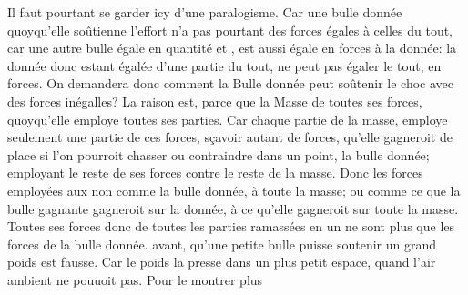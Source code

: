  \pstart Il faut pourtant se garder icy d'une paralogisme. Car une bulle donn\'{e}e quoyqu'elle soûtienne l'effort  n'a pas pourtant des forces \'{e}gales \`{a} celles du tout, car une autre bulle \'{e}gale en quantit\'{e} et , est aussi \'{e}gale en forces \`{a} la donn\'{e}e: la donn\'{e}e donc estant \'{e}gal\'{e}e d'une partie du tout, ne peut pas \'{e}galer le tout, en forces. On demandera donc comment la Bulle donn\'{e}e peut soûtenir le choc avec des forces in\'{e}galles? La raison est, parce que la Masse  de toutes ses forces, quoyqu'elle employe toutes ses parties. Car chaque partie de la masse, employe seulement une partie de ces forces, s\c{c}avoir autant de forces,  qu'elle gagneroit de place si l'on pourroit chasser ou contraindre dans un point, la bulle donn\'{e}e; employant le reste de ses forces contre le reste de la masse. Donc les forces employ\'{e}es  aux non  comme la bulle donn\'{e}e, \`{a} toute la masse; ou comme ce que la bulle gagnante gagneroit sur la donn\'{e}e, \`{a} ce qu'elle gagneroit sur toute la masse. Toutes ses forces donc de toutes les parties ramass\'{e}es en un ne sont plus que les forces de la bulle donn\'{e}e.  avant, qu'une petite bulle puisse soutenir un grand poids\protect{} est fausse. Car le poids\protect{} la presse dans un plus petit espace, quand l'air ambient ne pouuoit pas. Pour le montrer plus